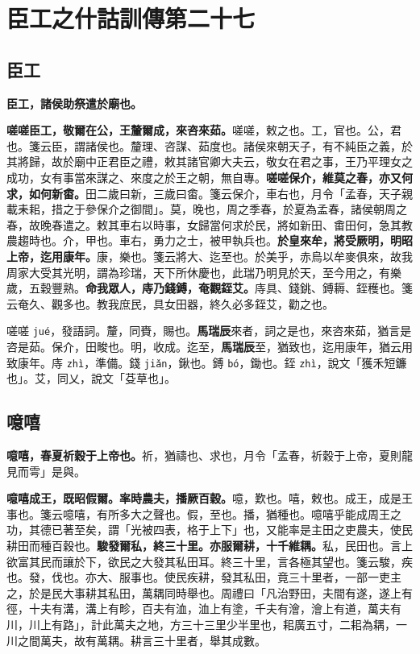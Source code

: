 \chapter{臣工之什詁訓傳第二十七}

\section{臣工}


\textbf{臣工，諸侯助祭遣於廟也。}

\textbf{嗟嗟臣工，敬爾在公，王釐爾成，來咨來茹。}{\footnotesize 嗟嗟，敕之也。工，官也。公，君也。箋云臣，謂諸侯也。釐理、咨謀、茹度也。諸侯來朝天子，有不純臣之義，於其將歸，故於廟中正君臣之禮，敕其諸官卿大夫云，敬女在君之事，王乃平理女之成功，女有事當來謀之、來度之於王之朝，無自專。}\textbf{嗟嗟保介，維莫之春，亦又何求，如何新畬。}{\footnotesize 田二歲曰新，三歲曰畬。箋云保介，車右也，月令「孟春，天子親載耒耜，措之于參保介之御間」。莫，晚也，周之季春，於夏為孟春，諸侯朝周之春，故晚春遣之。敕其車右以時事，女歸當何求於民，將如新田、畬田何，急其教農趨時也。介，甲也。車右，勇力之士，被甲執兵也。}\textbf{於皇來牟，將受厥明，明昭上帝，迄用康年。}{\footnotesize 康，樂也。箋云將大、迄至也。於美乎，赤烏以牟麥俱來，故我周家大受其光明，謂為珍瑞，天下所休慶也，此瑞乃明見於天，至今用之，有樂歲，五穀豐熟。}\textbf{命我眾人，庤乃錢鎛，奄觀銍艾。}{\footnotesize 庤具、錢銚、鎛耨、銍穫也。箋云奄久、觀多也。教我庶民，具女田器，終久必多銍艾，勸之也。}

\begin{quoting}嗟嗟 \texttt{jué}，發語詞。釐，同賚，賜也。\textbf{馬瑞辰}來者，詞之是也，來咨來茹，猶言是咨是茹。保介，田畯也。明，收成。迄至，\textbf{馬瑞辰}至，猶致也，迄用康年，猶云用致康年。庤 \texttt{zhì}，準備。錢 \texttt{jiǎn}，鍬也。鎛 \texttt{bó}，鋤也。銍 \texttt{zhì}，說文「獲禾短鐮也」。艾，同乂，說文「芟草也」。\end{quoting}

\section{噫嘻}


\textbf{噫嘻，春夏祈穀于上帝也。}{\footnotesize 祈，猶禱也、求也，月令「孟春，祈穀于上帝，夏則龍見而雩」是與。}

\textbf{噫嘻成王，既昭假爾。率時農夫，播厥百穀。}{\footnotesize 噫，歎也。嘻，敕也。成王，成是王事也。箋云噫嘻，有所多大之聲也。假，至也。播，猶種也。噫嘻乎能成周王之功，其德已著至矣，謂「光被四表，格于上下」也，又能率是主田之吏農夫，使民耕田而種百穀也。}\textbf{駿發爾私，終三十里。亦服爾耕，十千維耦。}{\footnotesize 私，民田也。言上欲富其民而讓於下，欲民之大發其私田耳。終三十里，言各極其望也。箋云駿，疾也。發，伐也。亦大、服事也。使民疾耕，發其私田，竟三十里者，一部一吏主之，於是民大事耕其私田，萬耦同時舉也。周禮曰「凡治野田，夫間有遂，遂上有徑，十夫有溝，溝上有畛，百夫有洫，洫上有塗，千夫有澮，澮上有道，萬夫有川，川上有路」，計此萬夫之地，方三十三里少半里也，耜廣五寸，二耜為耦，一川之間萬夫，故有萬耦。耕言三十里者，舉其成數。}

